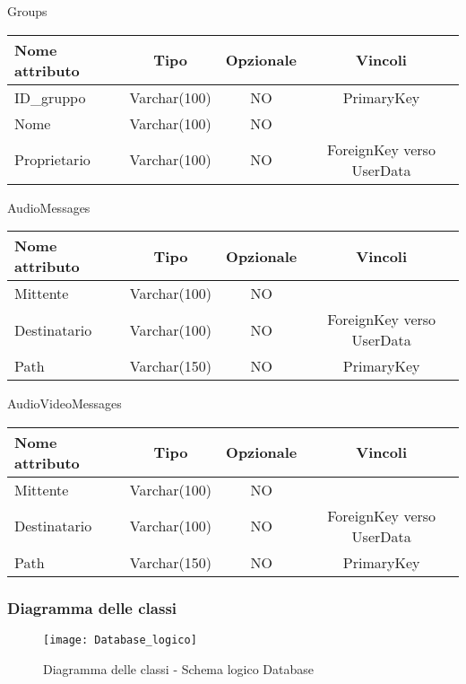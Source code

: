 \begin{center}
Groups

\begin{center}
\begin{tabular}{lccc}
\toprule
Nome attributo & Tipo & Opzionale & Vincoli\\
\midrule %
ID\_gruppo & Varchar(100) & NO & PrimaryKey\\
Nome & Varchar(100) & NO & \\
Proprietario & Varchar(100) & NO & ForeignKey verso UserData\\
\bottomrule
\end{tabular}
\end{center}	

AudioMessages

\begin{center}
\begin{tabular}{lccc}
\toprule
Nome attributo & Tipo & Opzionale & Vincoli\\
\midrule %
Mittente & Varchar(100) & NO & \\
Destinatario & Varchar(100) & NO & ForeignKey verso UserData\\
Path & Varchar(150) & NO & PrimaryKey\\
\bottomrule
\end{tabular}	
\end{center}	
\newpage
AudioVideoMessages

\begin{center}
\begin{tabular}{lccc}
\toprule
Nome attributo & Tipo & Opzionale & Vincoli\\
\midrule %
Mittente & Varchar(100) & NO & \\
Destinatario & Varchar(100) & NO & ForeignKey verso UserData\\
Path & Varchar(150) & NO & PrimaryKey\\
\bottomrule
\end{tabular}
\end{center}

\end{center}

\subsubsection{Diagramma delle classi}
\begin{figure}[H]
\begin{center}
\texttt{[image: Database\_logico]}
\caption{Diagramma delle classi - Schema logico Database}\label{fig:database_logico}
\end{center}
\end{figure}


